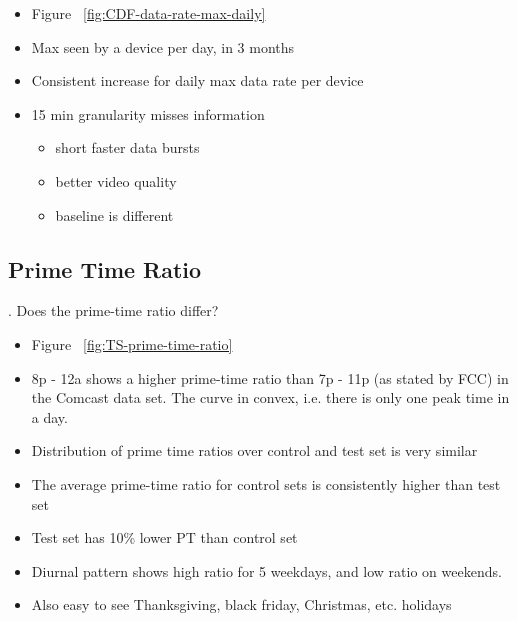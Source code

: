 
\begin{itemize}
\itemsep0em 
\item Figure ~\ref{fig:CDF-data-rate-max-daily}
\item Max seen by a device per day, in 3 months
\item Consistent increase for daily max data rate per device
\item 15 min granularity misses information
	\begin{itemize}
	\itemsep0em
	\item short faster data bursts
	\item better video quality
	\item baseline is different
	\end{itemize}
\end{itemize}



\subsection{Prime Time Ratio}
\label{subsec:prime-time}

. Does the prime-time ratio differ?

\begin{itemize}
\itemsep0em 
\item Figure ~\ref{fig:TS-prime-time-ratio}
\item 8p - 12a shows a higher prime-time ratio than 7p - 11p (as stated by FCC) in the Comcast data set. The curve in convex, i.e. there is only one peak time in a day.
\item Distribution of prime time ratios over control and test set is very similar
\item The average prime-time ratio for control sets is consistently higher than test set
\item Test set has 10\% lower PT than control set
\item Diurnal pattern shows high ratio for 5 weekdays, and low ratio on weekends.
\item Also easy to see Thanksgiving, black friday, Christmas, etc. holidays
\end{itemize}





